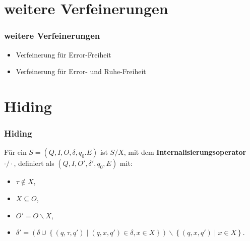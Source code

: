 \section{weitere Verfeinerungen}
\begin{frame}
  \frametitle{weitere Verfeinerungen}
  \begin{itemize}
    \item Verfeinerung für Error-Freiheit
    \item Verfeinerung für Error- und Ruhe-Freiheit
  \end{itemize}
\end{frame}

\section{Hiding}
\begin{frame}
  \frametitle{Hiding}
  \begin{Def}[Internalisierungsoperator]
    Für ein \EIO{} $S=(Q,I,O,\delta ,q_0.E)$ ist $S/X$, mit
    dem \textbf{Internalisierungsoperator} $\cdot /\cdot$,
    definiert als $(Q,I,O',\delta ', q_0,E)$ mit:
    \begin{itemize}
      \item $\tau \notin X$,
      \item $X\subseteq O$,
      \item $O'=O\backslash X$,
      \item $\delta '=\left(\delta\cup\left\{(q,\tau ,q')\mid (q,x,q')\in\delta
        ,x\in X\right\}\right)\backslash \left\{(q,x,q')\mid x\in X\right\}$.
    \end{itemize}
  \end{Def}
\end{frame}
